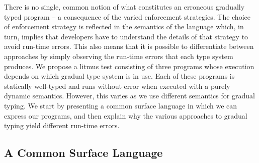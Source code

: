 \documentclass[a4paper,UKenglish]{lipics-v2018}
\begin{document}
\vspace{-7mm}
\noindent
There is no single, common notion of what constitutes an erroneous gradually
typed program -- a consequence of the varied enforcement strategies. The choice
of enforcement strategy is reflected in the semantics of the language
which, in turn, implies that developers have to understand the details of
that strategy to avoid run-time errors. This also
means that it is possible to differentiate between approaches by simply
observing the run-time errors that each type system produces. We propose a
litmus test consisting of three programs whose execution depends on which
gradual type system is in use. Each of these programs is statically 
well-typed and runs without error when executed with a purely dynamic semantics.
However, this varies as we use different semantics for gradual typing.
We start by presenting a common surface language in which we can
express our programs, and then explain why the various approaches to gradual
typing yield different run-time errors.

\subsection{A Common Surface Language}
\end{document}
